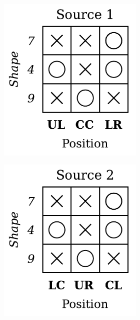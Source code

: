 \begin{definition}
\begin{figure}[H]
\begin{subfigure}[b]{0.45\textwidth}
\begin{subfigure}[b]{0.48\textwidth}
                \includegraphics[width=\textwidth]{img/datasets/2-CGO_fact=pos_env=0.pdf}
            \end{subfigure}
            \begin{subfigure}[b]{0.48\textwidth}
                \centering
                \includegraphics[width=\textwidth]{img/datasets/2-CGO_fact=pos_env=1.pdf}

\end{subfigure}
\end{subfigure}
\end{figure}
\end{definition}
